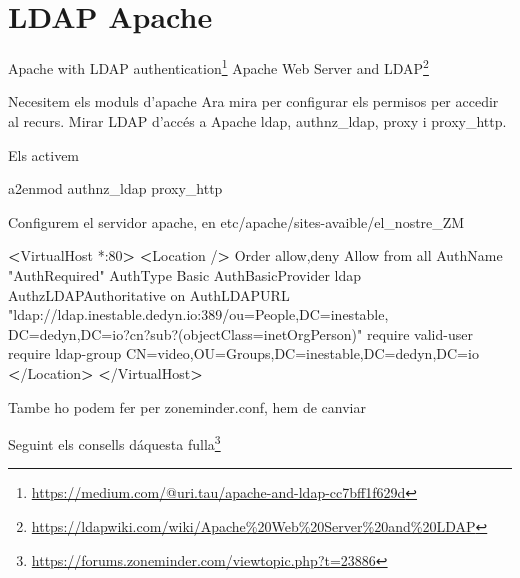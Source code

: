 \documentclass[
  10pt,
]{krantz}
\newenvironment{Shaded}{\begin{snugshade}}{\end{snugshade}}
\newcommand{\ExtensionTok}[1]{#1}
\newcommand{\NormalTok}[1]{#1}
\newcommand{\OperatorTok}[1]{\textcolor[rgb]{0.81,0.36,0.00}{\textbf{#1}}}
\newcommand{\StringTok}[1]{\textcolor[rgb]{0.31,0.60,0.02}{#1}}
\DeclareRobustCommand{\href}[2]{#2\footnote{\url{#1}}}
\begin{document}
\hypertarget{ldap-apache}{%
\section{LDAP Apache}\label{ldap-apache}}

\href{https://medium.com/@uri.tau/apache-and-ldap-cc7bff1f629d}{Apache with LDAP authentication} \href{https://ldapwiki.com/wiki/Apache\%20Web\%20Server\%20and\%20LDAP}{Apache Web Server and LDAP}

Necesitem els moduls d'apache Ara mira per configurar els permisos per accedir al recurs. Mirar LDAP d'accés a Apache ldap, authnz\_ldap, proxy i proxy\_http.

Els activem

\begin{Shaded}
\begin{Highlighting}[]
\ExtensionTok{a2enmod}\NormalTok{ authnz\_ldap proxy\_http }
\end{Highlighting}
\end{Shaded}

Configurem el servidor apache, en etc/apache/sites-avaible/el\_nostre\_ZM

\begin{Shaded}
\begin{Highlighting}[]
\OperatorTok{\textless{}}\NormalTok{VirtualHost }\ExtensionTok{*:80}\OperatorTok{\textgreater{}}
 \OperatorTok{\textless{}}\NormalTok{Location }\ExtensionTok{/}\OperatorTok{\textgreater{}}
  \ExtensionTok{Order}\NormalTok{ allow,deny}
  \ExtensionTok{Allow}\NormalTok{ from all}
  \ExtensionTok{AuthName} \StringTok{"AuthRequired"}
  \ExtensionTok{AuthType}\NormalTok{ Basic}
  \ExtensionTok{AuthBasicProvider}\NormalTok{ ldap}
  \ExtensionTok{AuthzLDAPAuthoritative}\NormalTok{ on}
  \ExtensionTok{AuthLDAPURL} \StringTok{"ldap://ldap.inestable.dedyn.io:389/ou=People,DC=inestable,}
\StringTok{  DC=dedyn,DC=io?cn?sub?(objectClass=inetOrgPerson)"}
  \ExtensionTok{require}\NormalTok{ valid{-}user}
  \ExtensionTok{require}\NormalTok{ ldap{-}group CN=video,OU=Groups,DC=inestable,DC=dedyn,DC=io}
 \OperatorTok{\textless{}}\NormalTok{/Location}\OperatorTok{\textgreater{}}
\OperatorTok{\textless{}}\NormalTok{/VirtualHost}\OperatorTok{\textgreater{}}
\end{Highlighting}
\end{Shaded}

Tambe ho podem fer per zoneminder.conf, hem de canviar

\href{https://forums.zoneminder.com/viewtopic.php?t=23886}{Seguint els consells dáquesta fulla}
\end{document}
